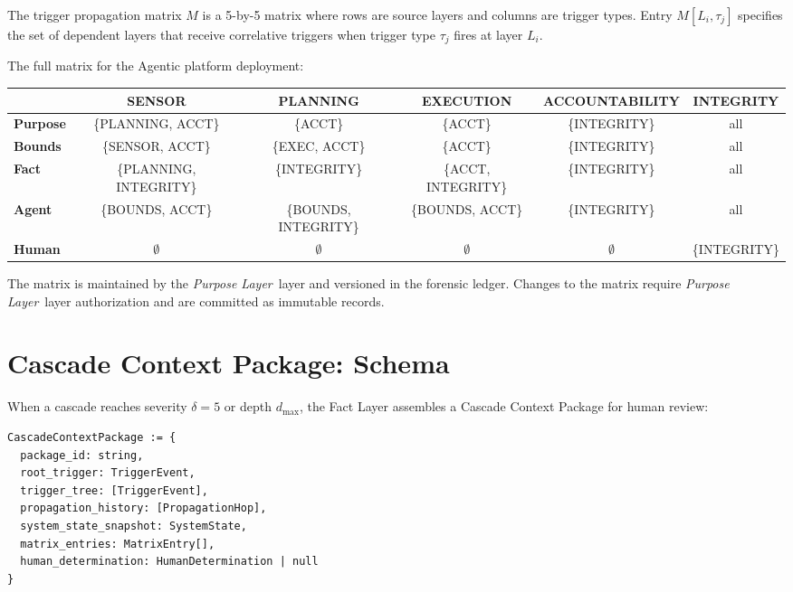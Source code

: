 \documentclass[12pt]{article}
\newcommand{\purpose}{\textit{Purpose Layer}}
\begin{document}
The trigger propagation matrix $M$ is a 5-by-5 matrix where rows are source layers and columns are trigger types. Entry $M[L_i, \tau_j]$ specifies the set of dependent layers that receive correlative triggers when trigger type $\tau_j$ fires at layer $L_i$.

The full matrix for the Agentic platform deployment:

\begin{center}
\begin{tabular}{l|ccccc}
  & \textbf{SENSOR} & \textbf{PLANNING} & \textbf{EXECUTION} & \textbf{ACCOUNTABILITY} & \textbf{INTEGRITY} \\
\hline
\textbf{Purpose} & \{PLANNING, ACCT\} & \{ACCT\} & \{ACCT\} & \{INTEGRITY\} & all \\
\textbf{Bounds} & \{SENSOR, ACCT\} & \{EXEC, ACCT\} & \{ACCT\} & \{INTEGRITY\} & all \\
\textbf{Fact} & \{PLANNING, INTEGRITY\} & \{INTEGRITY\} & \{ACCT, INTEGRITY\} & \{INTEGRITY\} & all \\
\textbf{Agent} & \{BOUNDS, ACCT\} & \{BOUNDS, INTEGRITY\} & \{BOUNDS, ACCT\} & \{INTEGRITY\} & all \\
\textbf{Human} & $\emptyset$ & $\emptyset$ & $\emptyset$ & $\emptyset$ & \{INTEGRITY\} \\
\end{tabular}
\end{center}

The matrix is maintained by the \purpose\ layer and versioned in the forensic ledger. Changes to the matrix require \purpose\ layer authorization and are committed as immutable records.

\section{Cascade Context Package: Schema}
\label{sec:cascade-package-schema}

When a cascade reaches severity $\delta = 5$ or depth $d_{\max}$, the Fact Layer assembles a Cascade Context Package for human review:

\begin{verbatim}
CascadeContextPackage := {
  package_id: string,
  root_trigger: TriggerEvent,
  trigger_tree: [TriggerEvent],
  propagation_history: [PropagationHop],
  system_state_snapshot: SystemState,
  matrix_entries: MatrixEntry[],
  human_determination: HumanDetermination | null
}
\end{verbatim}
\end{document}
